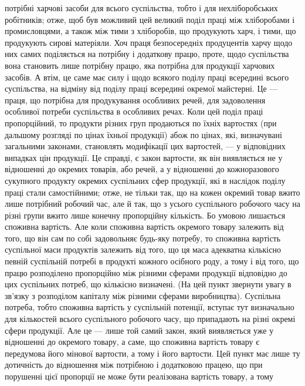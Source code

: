 \parcont{}  %
потрібні харчові засоби для всього суспільства, тобто і для нехліборобських робітників;
отже, щоб був можливий цей великий поділ праці між хліборобами
і промисловцями, а також між тими з хліборобів, що продукують харч, і тими,
що продукують сирові матеріяли. Хоч праця безпосередніх продуцентів харчу
щодо них самих поділяється на потрібну і додаткову працю, проте, щодо
суспільства вона становить лише потрібну працю, яка потрібна для продукції
харчових засобів. А втім, це саме має силу і щодо всякого поділу праці
всередині всього суспільства, на відміну від поділу праці всередині окремої майстерні.
Це — праця, що потрібна для продукування особливих речей, для задоволення
особливої потреби суспільства в особливих речах. Коли цей поділ праці
пропорційний, то продукти різних груп продаються по їхніх вартостях (при
дальшому розгляді по цінах їхньої продукції) абож по цінах, які, визначувані
загальними законами, становлять модифікації цих вартостей, — у відповідних
випадках цін продукції. Це справді, є закон вартости, як він виявляється не
у відношенні до окремих товарів, або речей, а у відношенні до кожноразового
сукупного продукту окремих суспільних сфер продукції, які в наслідок поділу
праці стали самостійними; отже, не тільки так, що на кожен окремий товар вжито
лише потрібний робочий час, але й так, що з усього суспільного робочого часу
на різні групи вжито лише конечну пропорційну кількість. Бо умовою лишається
споживна вартість. Але коли споживна вартість окремого товару залежить
від того, що він сам по собі задовольняє будь-яку потребу, то споживна вартість
суспільної маси продуктів залежить від того, що ця маса адекватна кількісно
певній суспільній потребі в продукті кожного осібного роду, а тому і від того,
що працю розподілено пропорційно між різними сферами продукції відповідно
до цих суспільних потреб, що кількісно визначені. (На цей пункт звернути
увагу в зв’язку з розподілом капіталу між різними сферами виробництва). Суспільна
потреба, тобто споживна вартість у суспільній потенції, вступає тут визначально
для кількостей всього суспільного робочого часу, що припадають на
різні окремі сфери продукції. Але це — лише той самий закон, який виявляється
уже у відношенні до окремого товару, а саме, що споживна вартість товару
є передумова його мінової вартости, а тому і його вартости. Цей пункт має
лише ту дотичність до відношення між потрібною і додатковою працею, що при
порушенні цієї пропорції не може бути реалізована вартість товару, а тому
